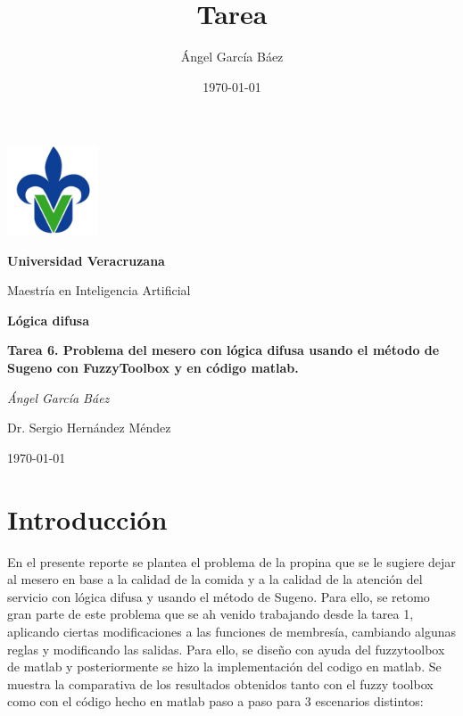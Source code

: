 \documentclass[11pt, letterpaper]{article}
\title{\bfseries Tarea}
\author{Ángel García Báez}
\date{\today}
\begin{document}
	
	\begin{titlepage}
		\centering
		\includegraphics[width=0.2\textwidth]{logo.png}\par
		\vspace{1cm}
		{\LARGE \bfseries Universidad Veracruzana \par}
		\vspace{1cm}
		{\Large Maestría en Inteligencia Artificial\par}
		\vspace{3cm}
		{\LARGE \bfseries Lógica difusa \par}
		\vspace{1cm}
		{\Large \bfseries Tarea 6. Problema del mesero con lógica difusa usando el método de Sugeno con FuzzyToolbox y en código matlab. \par}
		\vfill
		{\Large \textit{Ángel García Báez}\par}
		\vfill
		{\Large Dr. Sergio Hernández Méndez \par}
		\vfill
		{\Large \today \par}
	\end{titlepage}
	
	\newpage
	\tableofcontents
	\newpage
	

\section{Introducción}

En el presente reporte se plantea el problema de la propina que se le sugiere dejar al mesero en base a la calidad de la comida y a la calidad de la atención del servicio con lógica difusa y usando el método de Sugeno. Para ello, se retomo gran parte de este problema que se ah venido trabajando desde la tarea 1, aplicando ciertas modificaciones a las funciones de membresía, cambiando algunas reglas y modificando las salidas. Para ello, se diseño con ayuda del fuzzytoolbox de matlab y posteriormente se hizo la implementación del codigo en matlab. Se muestra la comparativa de los resultados obtenidos tanto con el fuzzy toolbox como con el código hecho en matlab paso a paso para 3 escenarios distintos:
\end{document}
